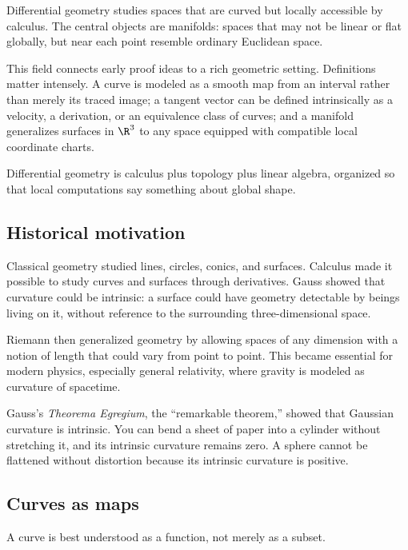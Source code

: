 Differential geometry studies spaces that are curved but locally accessible by
calculus. The central objects are manifolds: spaces that may not be linear or
flat globally, but near each point resemble ordinary Euclidean space.

This field connects early proof ideas to a rich geometric setting. Definitions
matter intensely. A curve is modeled as a smooth map
from an interval rather than merely its traced image; a tangent vector can be
defined intrinsically as a velocity, a derivation, or an equivalence class of curves; and a
manifold generalizes surfaces in $\R^3$ to any space equipped with compatible local
coordinate charts.

\begin{focusbox}
Differential geometry is calculus plus topology plus linear algebra, organized
so that local computations say something about global shape.
\end{focusbox}

\subsection{Historical motivation}

Classical geometry studied lines, circles, conics, and surfaces. Calculus made
it possible to study curves and surfaces through derivatives. Gauss showed that
curvature could be intrinsic: a surface could have geometry detectable by beings
living on it, without reference to the surrounding three-dimensional space.

Riemann then generalized geometry by allowing spaces of any dimension with a
notion of length that could vary from point to point. This became essential for
modern physics, especially general relativity, where gravity is modeled as
curvature of spacetime.

\begin{historybox}
Gauss's \emph{Theorema Egregium}, the ``remarkable theorem,'' showed that
Gaussian curvature is intrinsic. You can bend a sheet of paper into a cylinder
without stretching it, and its intrinsic curvature remains zero. A sphere cannot
be flattened without distortion because its intrinsic curvature is positive.
\end{historybox}

\subsection{Curves as maps}

A curve is best understood as a function, not merely as a subset.

